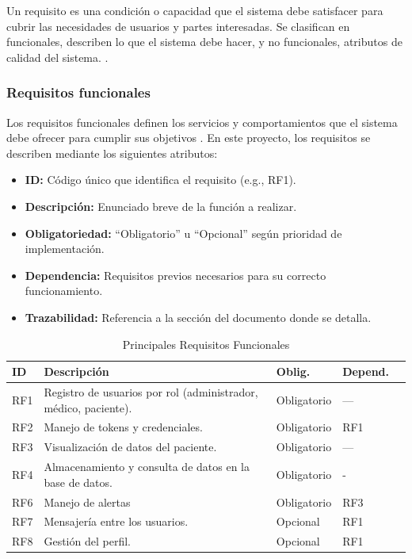 \documentclass[12pt, a4paper]{article}
\begin{document}
		Un requisito es una condición o capacidad que el sistema debe satisfacer para cubrir las necesidades de usuarios y partes interesadas. Se clasifican en funcionales, describen lo que el sistema debe hacer, y no funcionales, atributos de calidad del sistema. \cite{sommerville}.
	
			\subsubsection{Requisitos funcionales}
			
			Los requisitos funcionales definen los servicios y comportamientos que el sistema debe ofrecer para cumplir sus objetivos \cite{ieee830}. En este proyecto, los requisitos se describen mediante los siguientes atributos:
			
			\begin{itemize}
				\item \textbf{ID:} Código único que identifica el requisito (e.g., RF1).
				\item \textbf{Descripción:} Enunciado breve de la función a realizar.
				\item \textbf{Obligatoriedad:} “Obligatorio” u “Opcional” según prioridad de implementación.
				\item \textbf{Dependencia:} Requisitos previos necesarios para su correcto funcionamiento.
				\item \textbf{Trazabilidad:} Referencia a la sección del documento donde se detalla.
			\end{itemize}

			
			\begin{table}[ht]
				\centering
				\caption{Principales Requisitos Funcionales}
				\begin{tabular}{|p{1.5cm}|p{6cm}|p{2cm}|p{2cm}|p{3cm}|}
					\hline
					\textbf{ID} & \textbf{Descripción} & \textbf{Oblig.} & \textbf{Depend.} \\
					\hline
					RF1 & Registro de usuarios por rol (administrador, médico, paciente). & Obligatorio & —    \\
					\hline
					RF2 & Manejo de tokens y credenciales.                       & Obligatorio & RF1 \\
					\hline
					RF3 & Visualización de datos del paciente. & Obligatorio & —    \\
					\hline
					RF4 & Almacenamiento y consulta de datos en la base de datos.         & Obligatorio & - \\
					\hline
					RF6 & Manejo de alertas             & Obligatorio & RF3  \\
					\hline
					RF7 & Mensajería entre los usuarios.                              & Opcional   & RF1 \\
					\hline
					RF8 & Gestión del perfil.               & Opcional & RF1 \\
					\hline
				\end{tabular}
			\end{table}
	
\end{document}
